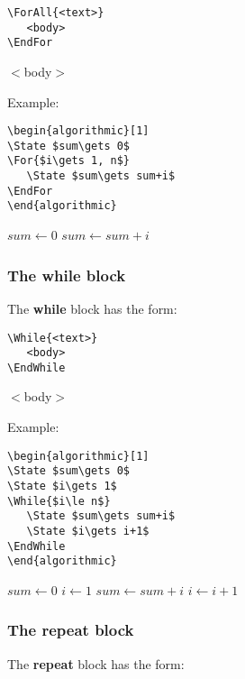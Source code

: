 \documentclass{article}
\newcommand\ASTART{\bigskip\noindent\begin{minipage}[b]{0.5\linewidth}}
\newcommand\ACONTINUE{\end{minipage}\begin{minipage}[b]{0.5\linewidth}}
\newcommand\AENDSKIP{\end{minipage}\bigskip}
\newcommand\AEND{\end{minipage}}
\begin{document}
\ASTART
\begin{verbatim}
\ForAll{<text>}
   <body>
\EndFor
\end{verbatim}
\ACONTINUE
\begin{algorithmic}[1]
   \State $<$body$>$
\EndFor
\end{algorithmic}
\AENDSKIP

\noindent Example:

\ASTART
\begin{verbatim}
\begin{algorithmic}[1]
\State $sum\gets 0$
\For{$i\gets 1, n$}
   \State $sum\gets sum+i$
\EndFor
\end{algorithmic}
\end{verbatim}
\ACONTINUE
\begin{algorithmic}[1]
\State $sum\gets 0$
   \State $sum\gets sum+i$
\EndFor
\Statex
\end{algorithmic}
\AEND

\subsubsection{The \textbf{while} block}
The \textbf{while} block has the form:

\ASTART
\begin{verbatim}
\While{<text>}
   <body>
\EndWhile
\end{verbatim}
\ACONTINUE
\begin{algorithmic}[1]
   \State $<$body$>$
\EndWhile
\end{algorithmic}
\AENDSKIP

\noindent Example:

\ASTART
\begin{verbatim}
\begin{algorithmic}[1]
\State $sum\gets 0$
\State $i\gets 1$
\While{$i\le n$}
   \State $sum\gets sum+i$
   \State $i\gets i+1$
\EndWhile
\end{algorithmic}
\end{verbatim}
\ACONTINUE
\begin{algorithmic}[1]
\State $sum\gets 0$
\State $i\gets 1$
   \State $sum\gets sum+i$
   \State $i\gets i+1$
\EndWhile
\Statex
\end{algorithmic}
\AEND

\subsubsection{The \textbf{repeat} block}
The \textbf{repeat} block has the form:
\end{document}
